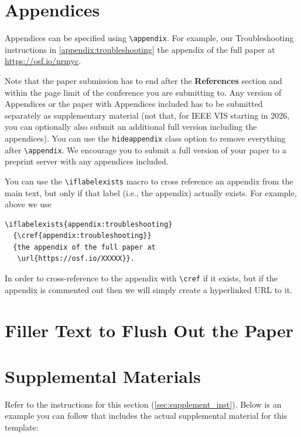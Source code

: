 \documentclass[journal]{vgtc}                     %
\begin{document}
\section{Appendices}
\label{sec:appendices_inst}

Appendices can be specified using \verb|\appendix|.
For example, our Troubleshooting instructions in
  {\cref{appendix:troubleshooting}}
  {the appendix of the full paper at \url{https://osf.io/nrmyc}}.

Note that the paper submission has to end after the \textbf{References} section and within the page limit of the conference you are submitting to.
Any version of Appendices or the paper with Appendices included has to be submitted separately as supplementary material (not that, for IEEE VIS starting in 2026, you can optionally also submit an additional full version including the appendices).
You can use the \verb|hideappendix| class option to remove everything after \verb|\appendix|.
We encourage you to submit a full version of your paper to a preprint server with any appendices included.

You can use the \verb|\iflabelexists| macro to cross reference an appendix from the main text, but only if that label (i.e., the appendix) actually exists.
For example, above we use

\begin{verbatim}
\iflabelexists{appendix:troubleshooting}
  {\cref{appendix:troubleshooting}}
  {the appendix of the full paper at
   \url{https://osf.io/XXXXX}}.
\end{verbatim}

In order to cross-reference to the appendix with \verb|\cref| if it exists, but if the appendix is commented out then we will simply create a hyperlinked URL to it.


\section{Filler Text to Flush Out the Paper}

\lipsum[1-2]%


\section*{Supplemental Materials}
\label{sec:supplemental_materials}

Refer to the instructions for this section (\cref{sec:supplement_inst}).
Below is an example you can follow that includes the actual supplemental material for this template:
\end{document}
